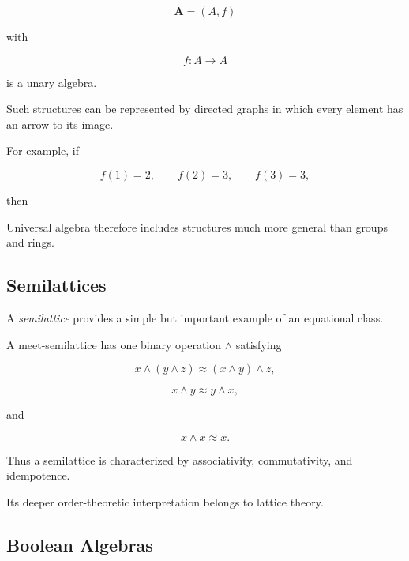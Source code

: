 \[ \mathbf A=(A,f) \]

with

\[ f:A\to A \]

is a unary algebra.

Such structures can be represented by directed graphs in which every
element has an arrow to its image.

For example, if

\[ f(1)=2,\qquad f(2)=3,\qquad f(3)=3, \]

then

\begin{center}
\end{center}

Universal algebra therefore includes structures much more general than
groups and rings.

\subsection{Semilattices}
\label{subsec:universal-semilattices}

A \emph{semilattice} provides a simple but important example of an
equational class.

A meet-semilattice has one binary operation \(\wedge\) satisfying

\[ x\wedge(y\wedge z)\approx(x\wedge y)\wedge z, \]

\[ x\wedge y\approx y\wedge x, \]

and

\[ x\wedge x\approx x. \]

Thus a semilattice is characterized by associativity, commutativity, and
idempotence.

Its deeper order-theoretic interpretation belongs to lattice theory.

\subsection{Boolean Algebras}
\label{subsec:universal-boolean-algebras}

